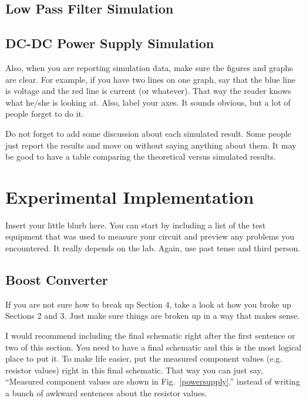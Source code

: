 \documentclass[11pt]{article}
\begin{document}
\subsection{Low Pass Filter Simulation}

\subsection{DC-DC Power Supply Simulation}

Also, when you are reporting simulation data, make sure the figures and graphs are clear. For example, if you have two lines on one graph, say that the blue line is voltage and the red line is current (or whatever). That way the reader knows what he/she is looking at. Also, label your axes. It sounds obvious, but a lot of people forget to do it.

Do not forget to add some discussion about each simulated result. Some people just report the results and move on without saying anything about them. It may be good to have a table comparing the theoretical versus simulated results. 

\section{Experimental Implementation}
\label{exp_section}

Insert your little blurb here. You can start by including a list of the test equipment that was used to measure your circuit and preview any problems you encountered. It really depends on the lab. Again, use past tense and third person.

\subsection{Boost Converter}

If you are not sure how to break up Section 4, take a look at how you broke up Sections 2 and 3. Just make sure things are broken up in a way that makes sense. 

I would recommend including the final schematic right after the first sentence or two of this section. You need to have a final schematic and this is the most logical place to put it. To make life easier, put the measured component values (e.g. resistor values) right in this final schematic. That way you can just say, “Measured component values are shown in Fig.~\ref{powersupply}.'' instead of writing a bunch of awkward sentences about the resistor values.
\end{document}
